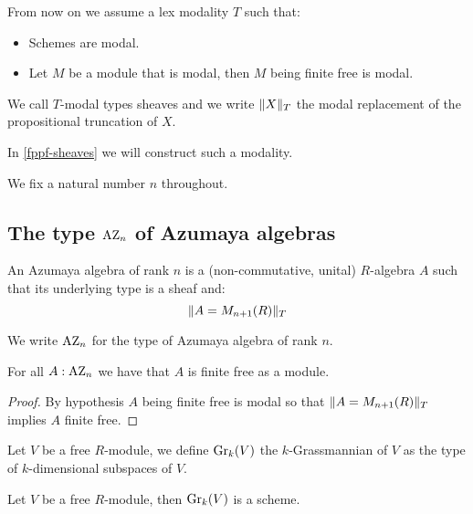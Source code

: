 From now on we assume a lex modality $T$ such that:
\begin{itemize}
\item Schemes are modal.
\item Let $M$ be a module that is modal, then $M$ being finite free is modal.
\end{itemize}
We call $T$-modal types sheaves and we write $\lVert X \rVert_T$ the modal replacement of the propositional truncation of $X$.

In \cref{fppf-sheaves} we will construct such a modality.

We fix a natural number $n$ throughout.


\subsection{The type $\mathrm{AZ}_n$ of Azumaya algebras}

\begin{definition}
An Azumaya algebra of rank $n$ is a (non-commutative, unital) $R$-algebra $A$ such that its underlying type is a sheaf and:
\[\lVert A=M_{n+1}(R) \rVert_T\]
\end{definition}

We write $\mathrm{AZ}_n$ for the type of Azumaya algebra of rank $n$.

\begin{lemma}\label{azumayas-are-finite-free}
For all $A:\mathrm{AZ}_n$ we have that $A$ is finite free as a module.
\end{lemma}

\begin{proof}
By hypothesis $A$ being finite free is modal so that $\lVert A=M_{n+1}(R) \rVert_T$ implies $A$ finite free.
\end{proof}

\begin{definition}
Let $V$ be a free $R$-module, we define $\mathrm{Gr}_k(V)$ the $k$-Grassmannian of $V$ as the type of $k$-dimensional subspaces of $V$.
\end{definition}

\begin{lemma}\label{grassmanians-are-schemes}
Let $V$ be a free $R$-module, then $\mathrm{Gr}_k(V)$ is a scheme.
\end{lemma}


